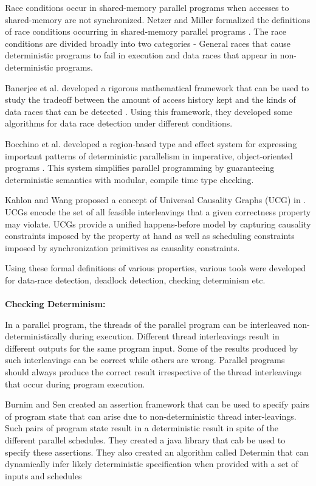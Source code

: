 Race conditions occur in shared-memory parallel programs when accesses to shared-memory are not synchronized. Netzer and Miller formalized the definitions of  race conditions occurring in shared-memory parallel programs \cite{netzer1992race}. The race conditions are divided broadly into two categories - General races that cause deterministic programs to fail in execution and data races that appear in non-deterministic programs.

Banerjee et al. developed a rigorous mathematical framework that can be used to study the tradeoff between the amount of access history kept and the kinds of data races that can be detected \cite{banerjee2006theory}. Using this framework, they developed some algorithms for data race detection under different conditions.

Bocchino et al. developed a region-based type and effect system for expressing important patterns of deterministic parallelism in imperative, object-oriented programs \cite{bocchino2009type}. This system simplifies parallel programming by guaranteeing deterministic semantics with modular, compile time type checking.

Kahlon and Wang proposed a concept of Universal Causality Graphs (UCG) in \cite{kahlon2010universal}. UCGs encode the set of all feasible interleavings that a given correctness property may violate. UCGs provide a unified happens-before model by capturing causality constraints imposed by the property at hand as well as scheduling constraints imposed by synchronization primitives as causality constraints.

Using these formal definitions of various properties, various tools were developed for data-race detection, deadlock detection, checking determinism etc.\\
\\
\textbf{Checking Determinism: }

In a parallel program, the threads of the parallel program can be interleaved non-deterministically during execution. Different thread interleavings result in different outputs for the same program input. Some of the results produced by such interleavings can be correct while others are wrong. Parallel programs should always produce the correct result irrespective of the thread interleavings that occur during program execution.

Burnim and Sen created an assertion framework that can be used to specify pairs of program state that can arise due to non-deterministic thread inter-leavings\cite{burnim2009asserting}. Such pairs of program state result in a deterministic result in spite of the different parallel schedules. They created a java library that cab be used to specify these assertions. They also created an algorithm called Determin \cite{burnim2010determin} that can dynamically infer likely deterministic specification when provided with a set of inputs and schedules


